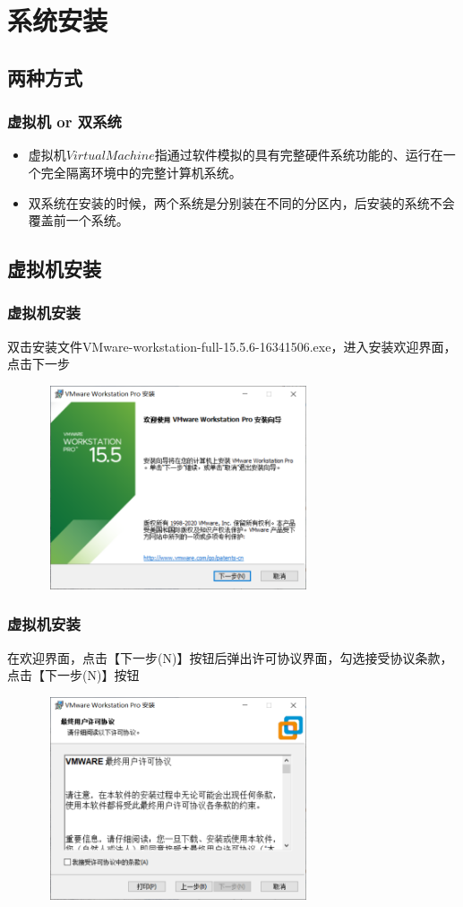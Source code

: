 \documentclass[notheorems,serif]{beamer}
\begin{document}
\section{系统安装}
\subsection{两种方式}
\begin{frame}
\frametitle{虚拟机 or 双系统}
\begin{itemize}
\item 虚拟机\(Virtual Machine\)指通过软件模拟的具有完整硬件系统功能的、运行在一个完全隔离环境中的完整计算机系统。
\item 双系统在安装的时候，两个系统是分别装在不同的分区内，后安装的系统不会覆盖前一个系统。
\end{itemize}
\end{frame}

\subsection{虚拟机安装}
\begin{frame}
\frametitle{虚拟机安装}
双击安装文件VMware-workstation-full-15.5.6-16341506.exe，进入安装欢迎界面，点击下一步
\begin{figure}
\centering
\includegraphics[width=8cm,height=6cm]{./figures/图片1.png}
\end{figure}
\end{frame}

\begin{frame}
\frametitle{虚拟机安装}
在欢迎界面，点击【下一步(N)】按钮后弹出许可协议界面，勾选接受协议条款，点击【下一步(N)】按钮
\begin{figure}
\centering
\includegraphics[width=8cm,height=6cm]{./figures/图片2.png}
\end{figure}
\end{frame}
\end{document}
